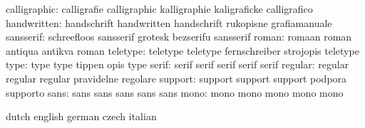              calligraphic: calligrafie               calligraphic
                           kalligraphie              kaligraficke
                           calligrafico
              handwritten: handschrift               handwritten
                           handschrift               rukopisne
                           grafiamanuale
                sansserif: schreefloos               sansserif
                           grotesk                   bezserifu
                           sansserif                 %
                    roman: romaan                    roman
                           antiqua                   antikva
                           roman                     %
                 teletype: teletype                  teletype
                           fernschreiber             strojopis
                           teletype                  %
                     type: type                      type
                           tippen                    opis
                           type                      %
                    serif: serif                     serif
                           serif                     serif
                           serif                     %
                  regular: regular                   regular
                           regular                   pravidelne
                           regolare
                  support: support                   support
                           support                   podpora
                           supporto
                     sans: sans                      sans
                           sans                      sans
                           sans
                     mono: mono                      mono
                           mono                      mono
                           mono

\stopvariables




\startsetupvariables       dutch                     english
                           german                    czech
                           italian

